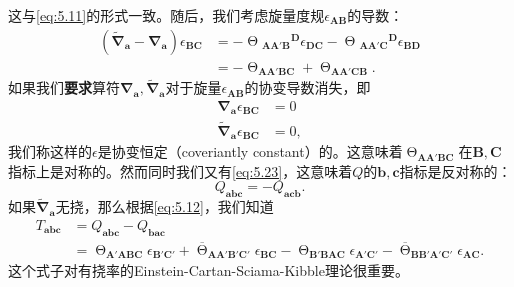 这与\ref{eq:5.11}的形式一致。随后，我们考虑旋量度规$\epsilon _{\boldsymbol{AB}}$的导数：
\begin{equation}
	\begin{aligned}
		(\tilde{\boldsymbol{\nabla }}_{\boldsymbol{a}} -\boldsymbol{\nabla }_{\boldsymbol{a}} )\epsilon _{\boldsymbol{BC}} & =-\upTheta {_{\boldsymbol{AA} '\boldsymbol{B}}}^{\boldsymbol{D}} \epsilon _{\boldsymbol{DC}} -\upTheta {_{\boldsymbol{AA} '\boldsymbol{C}}}^{\boldsymbol{D}} \epsilon _{\boldsymbol{BD}}\\
		& =-\upTheta _{\boldsymbol{AA} '\boldsymbol{BC}} +\upTheta _{\boldsymbol{AA} '\boldsymbol{CB}} .
	\end{aligned}
	\label{eq:5.24}
\end{equation}
如果我们\textbf{要求}算符$\boldsymbol{\nabla }_{\boldsymbol{a}} ,\tilde{\boldsymbol{\nabla }}_{\boldsymbol{a}}$对于旋量$\epsilon _{\boldsymbol{AB}}$的协变导数消失，即
\begin{equation*}
	\begin{aligned}
		\boldsymbol{\nabla }_{\boldsymbol{a}} \epsilon _{\boldsymbol{BC}} & =0\\
		\tilde{\boldsymbol{\nabla }}_{\boldsymbol{a}} \epsilon _{\boldsymbol{BC}} & =0,
	\end{aligned}
\end{equation*}
我们称这样的$\epsilon $是协变恒定（coveriantly constant）的。这意味着$\upTheta _{\boldsymbol{AA} '\boldsymbol{BC}}$在$\boldsymbol{B} ,\boldsymbol{C}$指标上是对称的。然而同时我们又有\ref{eq:5.23}，这意味着$Q$的$\boldsymbol{b} ,\boldsymbol{c}$指标是反对称的：
\begin{equation}
	Q_{\boldsymbol{abc}} =-Q_{\boldsymbol{acb}} .
	\label{eq:5.25}
\end{equation}
如果$\tilde{\boldsymbol{\nabla }}_{\boldsymbol{a}}$无挠，那么根据\ref{eq:5.12}，我们知道
\begin{equation*}
	\begin{aligned}
		T_{\boldsymbol{abc}} & =Q_{\boldsymbol{abc}} -Q_{\boldsymbol{bac}}\\
		& =\upTheta _{\boldsymbol{A} '\boldsymbol{ABC}} \epsilon _{\boldsymbol{B} '\boldsymbol{C} '} +\overline{\upTheta }_{\boldsymbol{AA} '\boldsymbol{B} '\boldsymbol{C} '} \epsilon _{\boldsymbol{BC}} -\upTheta _{\boldsymbol{B} '\boldsymbol{BAC}} \epsilon _{\boldsymbol{A} '\boldsymbol{C} '} -\overline{\upTheta }_{\boldsymbol{BB} '\boldsymbol{A} '\boldsymbol{C} '} \epsilon _{\boldsymbol{AC}} .
	\end{aligned}
\end{equation*}
这个式子对有挠率的Einstein-Cartan-Sciama-Kibble理论很重要。

